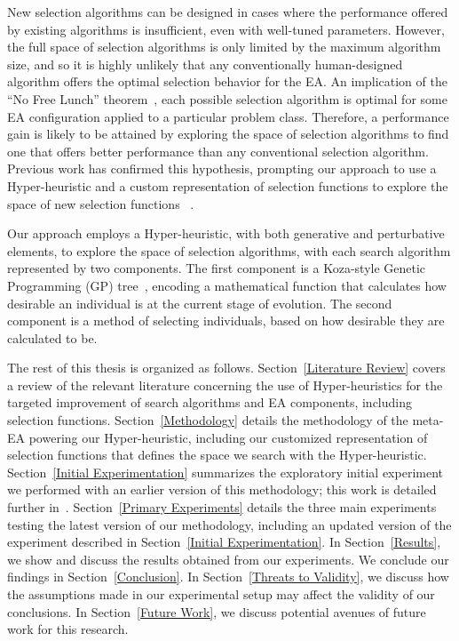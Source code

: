 \documentclass[sigconf]{acmart}
\begin{document}
New selection algorithms can be designed in cases where the performance offered by existing algorithms is insufficient, even with well-tuned parameters. However, the full space of selection algorithms is only limited by the maximum algorithm size, and so it is highly unlikely that any conventionally human-designed algorithm offers the optimal selection behavior for the EA. An implication of the ``No Free Lunch'' theorem~\citep{wolpert1995noFreeLunch}, each possible selection algorithm is optimal for some EA configuration applied to a particular problem class. Therefore, a performance gain is likely to be attained by exploring the space of selection algorithms to find one that offers better performance than any conventional selection algorithm. Previous work has confirmed this hypothesis, prompting our approach to use a Hyper-heuristic and a custom representation of selection functions to explore the space of new selection functions ~\citep{woodward2011selection}.

Our approach employs a Hyper-heuristic, with both generative and perturbative elements, to explore the space of selection algorithms, with each search algorithm represented by two components. The first component is a Koza-style Genetic Programming (GP) tree~\citep{koza1994genetic}, encoding a mathematical function that calculates how desirable an individual is at the current stage of evolution. The second component is a method of selecting individuals, based on how desirable they are calculated to be.

The rest of this thesis is organized as follows. Section~\ref{Literature Review} covers a review of the relevant literature concerning the use of Hyper-heuristics for the targeted improvement of search algorithms and EA components, including selection functions. Section~\ref{Methodology} details the methodology of the meta-EA powering our Hyper-heuristic, including our customized representation of selection functions that defines the space we search with the Hyper-heuristic. Section~\ref{Initial Experimentation} summarizes the exploratory initial experiment we performed with an earlier version of this methodology; this work is detailed further in~\citep{richter2018adpsea}. Section~\ref{Primary Experiments} details the three main experiments testing the latest version of our methodology, including an updated version of the experiment described in Section~\ref{Initial Experimentation}. In Section~\ref{Results}, we show and discuss the results obtained from our experiments. We conclude our findings in Section~\ref{Conclusion}. In Section~\ref{Threats to Validity}, we discuss how the assumptions made in our experimental setup may affect the validity of our conclusions. In Section~\ref{Future Work}, we discuss potential avenues of future work for this research.
\end{document}
